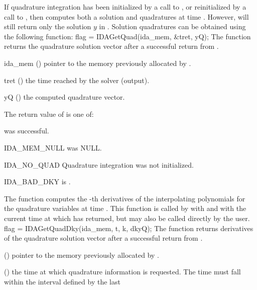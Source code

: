 {If quadrature integration has been initialized by a call to ,
or reinitialized by a call to , then {\idas} computes both a solution
and quadratures at time . However,  will still return only the solution
$y$ in . Solution quadratures can be obtained using the following function:
{
  flag = IDAGetQuad(ida\_mem, \&tret, yQ);
}
{
  The function  returns the quadrature solution vector after a
  successful return from .
}
{
  \begin{args}
  \item[ida\_mem] ()
    pointer to the memory previously allocated by .
  \item[tret] ()
    the time reached by the solver (output).
  \item[yQ] ()
    the computed quadrature vector.
  \end{args}
}
{
  The return value  of  is one of:
  \begin{args}
  \item[\Id{IDA\_SUCCESS}] 
     was successful.
  \item[IDA\_MEM\_NULL] 
     was NULL.
  \item[IDA\_NO\_QUAD] 
    Quadrature integration was not initialized.
  \item[IDA\_BAD\_DKY] 
     is .
  \end{args}
}
{}
The function  computes the -th derivatives of the interpolating 
polynomials for the quadrature variables at time .
This function is called by  with  and with the current
time at which  has returned, but may also be called 
directly by the user.
{
  flag = IDAGetQuadDky(ida\_mem, t, k, dkyQ);
}
{
  The function  returns derivatives of the quadrature solution 
  vector after a successful return from .
}
{
  \begin{args}
  \item[\id{ida\_mem}] ()
    pointer to the memory previously allocated by .
  \item[\id{t}] ()
    the time at which quadrature information is 
    requested. The time  must fall within the interval defined by the last 

\end{args}}}
